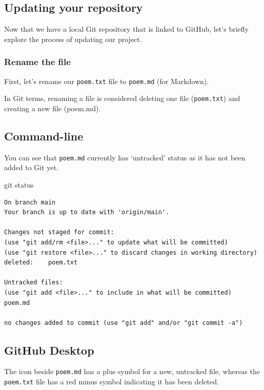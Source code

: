 \documentclass[
  letterpaper,
  DIV=11,
  numbers=noendperiod]{scrartcl}
\newenvironment{Shaded}{\begin{snugshade}}{\end{snugshade}}
\newcommand{\NormalTok}[1]{\textcolor[rgb]{0.00,0.23,0.31}{#1}}
\begin{document}
\subsection{Updating your repository}\label{updating-your-repository}

Now that we have a local Git repository that is linked to GitHub, let's
briefly explore the process of updating our project.

\subsubsection{Rename the file}\label{rename-the-file}

First, let's rename our \texttt{poem.txt} file to \texttt{poem.md} (for
Markdown).

In Git terms, renaming a file is considered deleting one file
(\texttt{poem.txt}) and creating a new file (poem.md).

\subsection{Command-line}

You can see that \texttt{poem.md} currently has `untracked' status as it
has not been added to Git yet.

\begin{Shaded}
\begin{Highlighting}[]
\NormalTok{git status}
\end{Highlighting}
\end{Shaded}

\begin{verbatim}
On branch main
Your branch is up to date with 'origin/main'.

Changes not staged for commit:
(use "git add/rm <file>..." to update what will be committed)
(use "git restore <file>..." to discard changes in working directory)
deleted:    poem.txt

Untracked files:
(use "git add <file>..." to include in what will be committed)
poem.md

no changes added to commit (use "git add" and/or "git commit -a")
\end{verbatim}

\subsection{GitHub Desktop}

The icon beside \texttt{poem.md} has a plus symbol for a new, untracked
file, whereas the \texttt{poem.txt} file has a red minus symbol
indicating it has been deleted.
\end{document}
